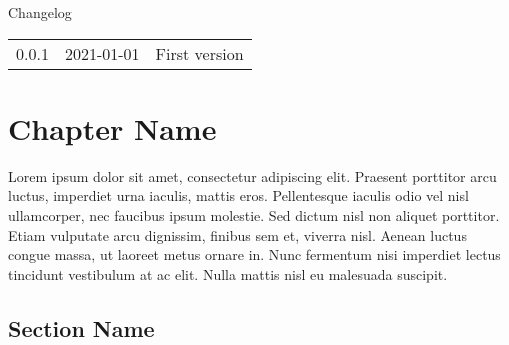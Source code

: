 \documentclass{faims3_report}
\begin{document}

\maketitle %

\newpage


\textcolor{faimsblue}{Changelog}

\begin{tabular}{@{}l l p{}}
	0.0.1 & 2021-01-01 & First version \\
\end{tabular}
\vfill
\copyrightnotice %

\newpage


\outputtoc %


\chapter{Chapter Name}

Lorem ipsum dolor sit amet, consectetur adipiscing elit. Praesent porttitor arcu luctus, imperdiet urna iaculis, mattis eros. Pellentesque iaculis odio vel nisl ullamcorper, nec faucibus ipsum molestie. Sed dictum nisl non aliquet porttitor. Etiam vulputate arcu dignissim, finibus sem et, viverra nisl. Aenean luctus congue massa, ut laoreet metus ornare in. Nunc fermentum nisi imperdiet lectus tincidunt vestibulum at ac elit. Nulla mattis nisl eu malesuada suscipit.

\section{Section Name}
\end{document}
